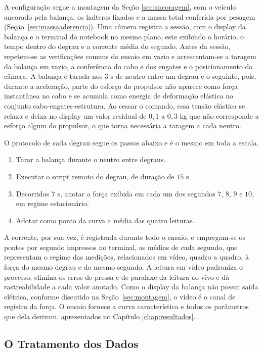 A configuração segue a montagem da Seção \ref{sec:ancoragem}, com o veículo ancorado pela
balança, os halteres fixados e a massa total conferida por pesagem (Seção~\ref{sec:massaaderencia}). Uma
câmera registra a sessão, com o display da balança e o terminal do notebook no mesmo
plano, este exibindo o horário, o tempo dentro do degrau e a corrente média do segundo.
Antes da sessão, repetem-se as verificações comuns do ensaio em vazio e acrescentam-se a
taragem da balança em vazio, a conferência do cabo e dos engates e o posicionamento da
câmera. A balança é tarada nos $3$ s de neutro entre um degrau e o seguinte, pois, durante
a aceleração, parte do esforço do propulsor não aparece como força instantânea no cabo e
se acumula como energia de deformação elástica no conjunto cabo-engates-estrutura.
Ao cessar o comando, essa tensão elástica se relaxa e deixa no display um
valor residual de $0{,}1$ a $0{,}3$ kg que não corresponde a esforço algum do propulsor, o
que torna necessária a taragem a cada neutro.

O protocolo de cada degrau segue os passos abaixo e é o mesmo em toda a escala.

\begin{enumerate}
    \item Tarar a balança durante o neutro entre degraus.
    \item Executar o script remoto do degrau, de duração de $15$ s.
    \item Decorridos $7$ s, anotar a força exibida em cada um dos segundos $7$, $8$, $9$ e
    $10$, em regime estacionário.
    \item Adotar como ponto da curva a média das quatro leituras.
\end{enumerate}

A corrente, por sua vez, é registrada durante todo o ensaio, e empregam-se os pontos por
segundo impressos no terminal, as médias de cada segundo, que representam o regime das
medições, relacionados em vídeo, quadro a quadro, à força do mesmo degrau e do mesmo
segundo. A leitura em vídeo padroniza o processo, elimina os erros de pressa e de paralaxe
da leitura ao vivo e dá rastreabilidade a cada valor anotado. Como o display da balança não
possui saída elétrica, conforme discutido na Seção~\ref{sec:montagem}, o vídeo é o canal de
registro da força. O ensaio fornece a curva característica e todos os
parâmetros que dela derivam, apresentados no Capítulo \ref{chap:resultados}.

\subsection{O Tratamento dos Dados}
\label{sec:tratamento}

